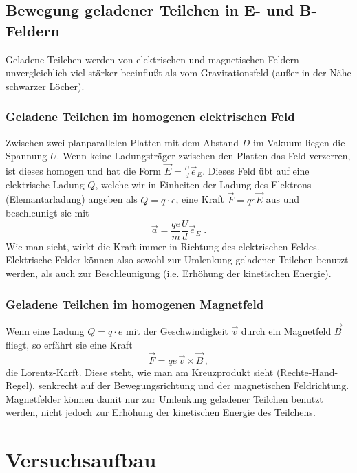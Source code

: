 \subsection{Bewegung geladener Teilchen in E- und B-Feldern}

Geladene Teilchen werden von elektrischen und magnetischen Feldern unvergleichlich viel stärker beeinflußt als vom Gravitationsfeld (außer in der Nähe schwarzer Löcher). 

\subsubsection*{Geladene Teilchen im homogenen elektrischen Feld}

Zwischen zwei planparallelen Platten mit dem Abstand $D$ im Vakuum liegen die Spannung $U$. Wenn keine Ladungsträger zwischen den Platten das Feld verzerren, ist dieses homogen und hat die Form $\vec{E}=\frac{U}{d}\vec{e}_E$. Dieses Feld übt auf eine elektrische Ladung $Q$, welche wir in Einheiten der Ladung des Elektrons (Elemantarladung) angeben als $Q = q\cdot e$, eine Kraft $\vec{F} = qe\vec{E}$ aus und beschleunigt sie mit
\begin{equation}
	\vec{a} = \frac{qe}{m}\frac{U}{d}\vec{e}_E\; .
\end{equation}
Wie man sieht, wirkt die Kraft immer in Richtung des elektrischen Feldes. Elektrische Felder können also sowohl zur Umlenkung geladener Teilchen benutzt werden, als auch zur Beschleunigung (i.e. Erhöhung der kinetischen Energie).

\subsubsection*{Geladene Teilchen im homogenen Magnetfeld}

Wenn eine Ladung $Q = q\cdot e$ mit der Geschwindigkeit $\vec{v}$ durch ein Magnetfeld $\vec{B}$ fliegt, so erfährt sie eine Kraft 
\begin{equation}
	\vec{F} = qe\, \vec{v}\times\vec{B}\, ,
\end{equation}
die Lorentz-Karft. Diese steht, wie man am Kreuzprodukt sieht (Rechte-Hand-Regel), senkrecht auf der Bewegungsrichtung und der magnetischen Feldrichtung. Magnetfelder können damit nur zur Umlenkung geladener Teilchen benutzt werden, nicht jedoch zur Erhöhung der kinetischen Energie des Teilchens.

\section{Versuchsaufbau}

